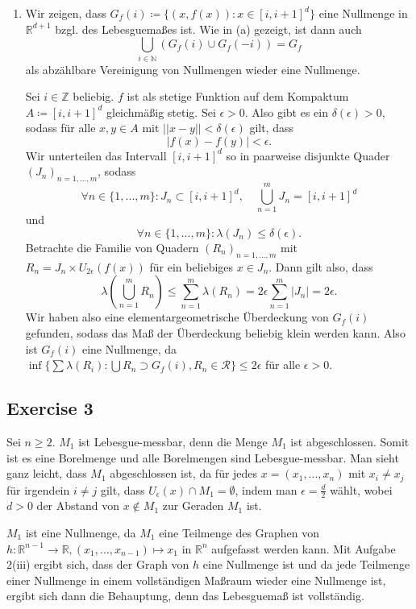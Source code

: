 \documentclass[a4paper]{article}
\begin{document}
\begin{enumerate}[label=(\roman*)]
	 \item Wir zeigen, dass $G_f(i) \coloneqq \{ (x,f(x)) : x \in [i, i+1]^d \}$ eine Nullmenge in $\mathbb R^{d+1}$ bzgl. des Lebesguemaßes ist. Wie in (a) gezeigt, ist dann auch
	 \[
	 	\bigcup_{i \in \mathbb N}( G_f(i) \cup G_f(-i)) = G_f
	 \]
	 als abzählbare Vereinigung von Nullmengen wieder eine Nullmenge.
	 
	 Sei $i \in \mathbb Z$ beliebig. $f$ ist als stetige Funktion auf dem Kompaktum $A \coloneqq [i, i+1]^d$ gleichmäßig stetig. Sei $\epsilon > 0$. Also gibt es ein $\delta(\epsilon) > 0$, sodass für alle $x,y \in A$ mit $||x-y|| < \delta(\epsilon)$ gilt, dass
	 \[
	 	|f(x)-f(y)| < \epsilon.
	 \]
Wir unterteilen das Intervall $[i,i+1]^d$ so in paarweise disjunkte Quader $(J_n)_{n = 1,...,m}$, sodass $$\forall n \in \{1,...,m\}: J_n \subset [i,i+1]^d, \quad \bigcup_{n=1}^m J_n = [i,i+1]^d$$ und $$\forall n \in \{1,...,m\}: \lambda(J_n) \leq \delta(\epsilon).$$ Betrachte die Familie von Quadern $(R_n)_{n = 1,...,m}$ mit $R_n = J_n \times U_{2\epsilon}(f(x))$ für ein beliebiges $x \in J_n$. Dann gilt also, dass
\[
	\lambda(\bigcup^m_{n=1} R_n) \leq \sum^m_{n=1}\lambda(R_n) = 2\epsilon \sum_{n=1}^m |J_n| = 2\epsilon.
\]
Wir haben also eine elementargeometrische Überdeckung von $G_f(i)$ gefunden, sodass das Maß der Überdeckung beliebig klein werden kann. Also ist $G_f(i)$ eine Nullmenge, da $\inf\{ \sum \lambda(R_i) : \bigcup R_n \supset G_f(i), R_n \in \mathcal R \} \leq 2\epsilon$ für alle $\epsilon > 0$.

\end{enumerate}


\subsection*{Exercise 3}
Sei $n \geq 2$. $M_1$ ist Lebesgue-messbar, denn die Menge $M_1$ ist abgeschlossen. Somit ist es eine Borelmenge und alle Borelmengen sind Lebesgue-messbar. Man sieht ganz leicht, dass $M_1$ abgeschlossen ist, da für jedes $x = (x_1,...,x_n)$ mit $x_i \neq x_j$ für irgendein $i \neq j$ gilt, dass $U_\epsilon(x) \cap M_1 = \emptyset$, indem man $\epsilon = \frac{d}{2}$ wählt, wobei $d > 0$ der Abstand von $x \notin M_1$ zur Geraden $M_1$ ist. 

$M_1$ ist eine Nullmenge, da $M_1$ eine Teilmenge des Graphen von $h: \mathbb R^{n-1} \to \mathbb R, (x_1,...,x_{n-1}) \mapsto x_1$  in  $\mathbb R^n$ aufgefasst werden kann. Mit Aufgabe 2(iii) ergibt sich, dass der Graph von $h$ eine Nullmenge ist und da jede Teilmenge einer Nullmenge in einem vollständigen Maßraum wieder eine Nullmenge ist, ergibt sich dann die Behauptung, denn das Lebesguemaß ist vollständig.
\end{document}
